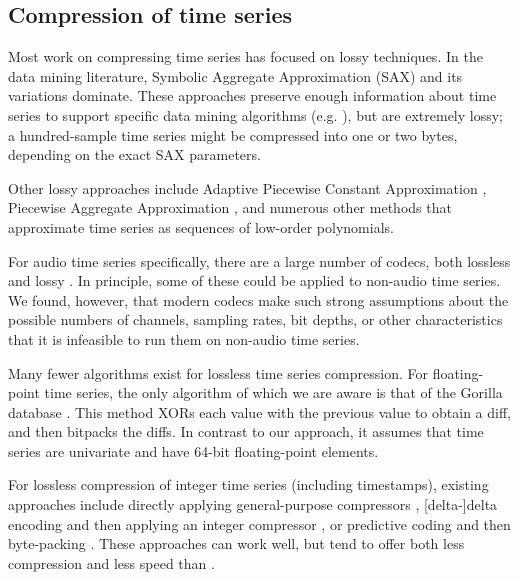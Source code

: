 
\subsection{Compression of time series}

Most work on compressing time series has focused on lossy techniques. In the data mining literature, Symbolic Aggregate Approximation (SAX) \cite{SAX} and its variations \cite{isax, isax2} dominate. These approaches preserve enough information about time series to support specific data mining algorithms (e.g. \cite{fastShapelet, hotSax}), but are extremely lossy; a hundred-sample time series might be compressed into one or two bytes, depending on the exact SAX parameters.

Other lossy approaches include Adaptive Piecewise Constant Approximation \cite{apca}, Piecewise Aggregate Approximation \cite{paa}, and numerous other methods \cite{swab, lemireSegmentation, tsCompressSmartGrid} that approximate time series as sequences of low-order polynomials.

For audio time series specifically, there are a large number of codecs, both lossless \cite{flac, alac} and lossy \cite{vorbis, shorten, aac, opus}. In principle, some of these could be applied to non-audio time series. We found, however, that modern codecs make such strong assumptions about the possible numbers of channels, sampling rates, bit depths, or other characteristics that it is infeasible to run them on non-audio time series.

Many fewer algorithms exist for lossless time series compression. For floating-point time series, the only algorithm of which we are aware is that of the Gorilla database \cite{gorilla}. This method XORs each value with the previous value to obtain a diff, and then bitpacks the diffs. In contrast to our approach, it assumes that time series are univariate and have 64-bit floating-point elements. %

For lossless compression of integer time series (including timestamps), existing approaches include directly applying general-purpose compressors \cite{respawnDB, openTSDB, chronicleDB, kairosDB, druid}, [delta-]delta encoding and then applying an integer compressor \cite{influxDB, gorilla}, or predictive coding and then byte-packing \cite{akumuli}. These approaches can work well, but tend to offer both less compression and less speed than \mine.


